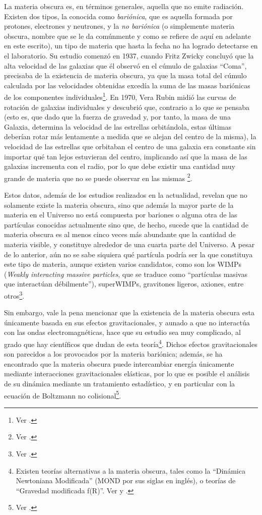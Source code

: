 \documentclass[11pt,twoside,openright,spanish]{report}
\numberwithin{equation}{chapter}
\numberwithin{figure}{chapter}
\numberwithin{table}{chapter}
\begin{document}
La materia obscura es, en términos generales, aquella que no emite radiación. Existen dos tipos, la conocida como \textit{bariónica}, que es aquella formada por protones, electrones y neutrones, y la \textit{no bariónica} (o simplemente materia obscura, nombre que se le da comúnmente y como se refiere de aquí en adelante en este escrito), un tipo de materia que hasta la fecha no ha logrado detectarse en el laboratorio. Su estudio comenzó en 1937, cuando Fritz Zwicky concluyó que la alta velocidad de las galaxias que él observó en el cúmulo de galaxias ``Coma'', precisaba de la existencia de materia obscura, ya que la masa total del cúmulo calculada por las velocidades obtenidas excedía la suma de las masas bariónicas de los componentes individuales\footnote{Ver \citet{trimbleeanodmitu}.}. En 1970, Vera Rubin midió las curvas de rotación de galaxias individuales y descubrió que, contrario a lo que se pensaba (esto es, que dado que la fuerza de gravedad y, por tanto, la masa de una Galaxia, determina la velocidad de las estrellas orbitándola, estas últimas deberían rotar más lentamente a medida que se alejan del centro de la misma), la velocidad de las estrellas que orbitaban el centro de una galaxia era constante sin importar qué tan lejos estuvieran del centro, implicando así que la masa de las galaxias incrementa con el radio, por lo que debe existir una cantidad muy grande de materia que no se puede observar en las mismas \footnote{Ver \citet{Hunter2017}.}. 

Estos datos, además de los estudios realizados en la actualidad, revelan que no solamente existe la materia obscura, sino que además la mayor parte de la materia en el Universo no está compuesta por bariones o alguna otra de las partículas conocidas actualmente sino que, de hecho, sucede que la cantidad de materia obscura es al menos cinco veces más abundante que la cantidad de materia visible, y constituye alrededor de una cuarta parte del Universo. A pesar de lo anterior, aún no se sabe siquiera qué partícula podría ser la que constituya este tipo de materia, aunque existen varios candidatos, como son los WIMPs (\textit{Weakly interacting massive particles}, que se traduce como ``partículas masivas que interactúan débilmente''), superWIMPs, gravitones ligeros, axiones, entre otros\footnote{Ver \citet{fengdmcfppamod}.}.

Sin embargo, vale la pena mencionar que la existencia de la materia obscura esta únicamente basada en sus efectos gravitacionales, y aunado a que no interactúa con las ondas electromagnéticas, hace que su estudio sea muy complicado, al grado que hay científicos que dudan de esta teoría\footnote{Existen teorías alternativas a la materia obscura, tales como la ``Dinámica Newtoniana Modificada'' (MOND por sus siglas en inglés), o teorías de ``Gravedad modificada f(R)''. Ver \citet{Gentile2018} y \citet{Lobo2009}.}. Dichos efectos gravitacionales son parecidos a los provocados por la materia bariónica; además, se ha encontrado que la materia obscura puede intercambiar energía únicamente mediante interacciones gravitacionales elásticas, por lo que es posible el análisis de su dinámica mediante un tratamiento estadístico, y en particular con la ecuación de Boltzmann no colisional\footnote{Ver \citet{ostrikernlodm}.}.
\end{document}
